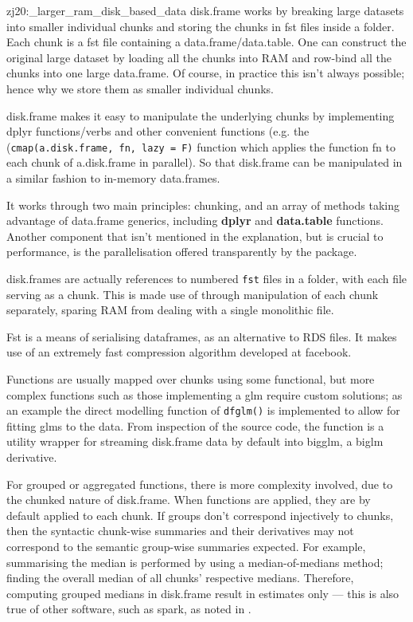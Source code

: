 \begin{displaycquote}{zj20:_larger_ram_disk_based_data}
        {disk.frame} works by breaking large datasets into smaller
        individual chunks and storing the chunks in fst files inside a
        folder. Each chunk is a fst file containing a data.frame/data.table.
        One can construct the original large dataset by loading all the
        chunks into RAM and row-bind all the chunks into one large
        data.frame. Of course, in practice this isn't always possible; hence
        why we store them as smaller individual chunks.

                {disk.frame} makes it easy to manipulate the underlying chunks by
        implementing dplyr functions/verbs and other convenient functions
        (e.g. the (\texttt{cmap(a.disk.frame, fn, lazy = F)} function which
        applies the function fn to each chunk of a.disk.frame in parallel).
        So that {disk.frame} can be manipulated in a similar fashion to
        in-memory data.frames.
\end{displaycquote}

It works through two main principles: chunking, and an array of methods taking advantage of data.frame generics, including \textbf{dplyr} and \textbf{data.table} functions. 
Another component that isn't mentioned in the explanation, but is crucial to performance, is the parallelisation offered transparently by the package.

disk.frames are actually references to numbered \texttt{fst} files in a folder, with each file serving as a chunk. 
This is made use of through manipulation of each chunk separately, sparing RAM from dealing with a single monolithic file\cite{zj19:_inges_data}.

Fst is a means of serialising dataframes, as an alternative to RDS files\cite{klik19}. 
It makes use of an extremely fast compression algorithm developed at facebook.

Functions are usually mapped over chunks using some functional, but more complex functions such as those implementing a glm require custom solutions; as an example the direct modelling function of \texttt{dfglm()} is implemented to allow for fitting glms to the data. 
From inspection of the source code, the function is a utility wrapper for streaming disk.frame data by default into bigglm, a biglm derivative.

For grouped or aggregated functions, there is more complexity involved, due to the chunked nature of disk.frame. 
When functions are applied, they are by default applied to each chunk. 
If groups don't correspond injectively to chunks, then the syntactic chunk-wise summaries and their derivatives may not correspond to the semantic group-wise summaries expected. 
For example, summarising the median is performed by using a median-of-medians method; finding the overall median of all chunks' respective medians. 
Therefore, computing grouped medians in disk.frame result in estimates only --- this is also true of other software, such as spark, as noted in \textcite{zj19:_group_by}.

